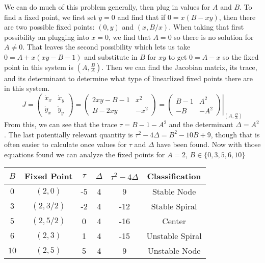 \documentclass{article}
\begin{document}
\hangindent=20pt
\vspace{10pt}
\newline We can do much of this problem generally, then plug in values for $A$ and $B$.  To find a fixed point, we first set $\dot{y} = 0$ and find that if $0 = x(B - xy)$, then there are two possible fixed points: $(0, y)$ and $(x, B/x)$.  When taking that first possibility an plugging into $\dot{x} = 0$, we find that $A = 0$ so there is no solution for $A \neq 0$.  That leaves the second possibility which lets us take $ 0 = A + x(xy - B - 1) $ and substitute in $B$ for $xy$ to get $0 = A - x$ so the fixed point in this system is $\displaystyle (A, \frac{B}{A})$.
\newline Then we can find the Jacobian matrix, its trace, and its determinant to determine what type of linearlized fixed points there are in this system.
\[
J = \left(\begin{array}{cc} \dot{x}_x & \dot{x}_y \\ \dot{y}_x & \dot{y}_y \end{array}\right) = \left(\begin{array}{cc} 2xy - B - 1 & x^2 \\ B - 2xy & -x^2 \end{array}\right) = \left.\left(\begin{array}{cc} B - 1 & A^2 \\ - B & -A^2 \end{array}\right)\right|_{(A, \frac{B}{A})}
\]
From this, we can see that the trace $\tau = B - 1 - A^2$ and the determinant $\Delta = A^2$.  The last potentially relevant quantity is $\tau^2 - 4\Delta = B^2 - 10B + 9$, though that is often easier to calculate once values for $\tau$ and $\Delta$ have been found.  Now with those equations found we can analyze the fixed points for $A = 2$, $B \in \{0,3,5,6,10\}$
\begin{center}\begin{tabular}{c|ccccc}
$B$ & Fixed Point & $\tau$ & $\Delta$ & $\tau^2 - 4\Delta$ & Classification \\
\hline
$0$ & $(2,0)$ & -5 & 4 & 9 & Stable Node\\
$3$ & $(2, 3/2)$ & -2 & 4 & -12 & Stable Spiral \\
$5$ & $(2, 5/2)$ & 0 & 4 & -16 & Center \\
$6$ & $(2, 3)$ & 1 & 4 & -15 & Unstable Spiral  \\
$10$ & $(2, 5)$ & 5 & 4 & 9 & Unstable Node  \\
\end{tabular}\end{center} 
\end{document}
